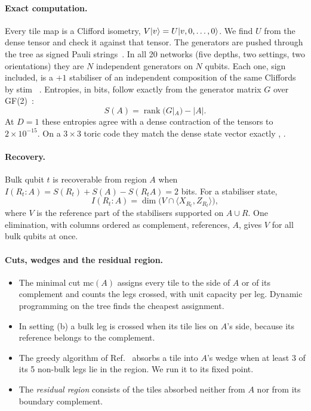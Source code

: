 \paragraph{Exact computation.} Every tile map is a Clifford isometry, $V\lvert v\rangle=U\lvert v,0,\dots,0\rangle$. We find $U$ from the dense tensor
and check it against that tensor. The generators are pushed through the tree as signed Pauli strings~\cite{aaronson2004}. In all 20
networks (five depths, two settings, two orientations) they are $N$ independent generators on $N$ qubits. Each one, sign included, is a
$+1$ stabiliser of an independent composition of the same Cliffords by stim~\cite{gidney2021} . Entropies, in bits,
follow exactly from the generator matrix $G$ over GF(2)~\cite{fattal2004,hamma2005}:
\begin{equation}\label{eq:holocode-rank}
S(A)=\operatorname{rank}\bigl(G|_A\bigr)-|A| .
\end{equation}
At $D=1$ these entropies agree with a dense contraction of the tensors to $2\times10^{-15}$. On a $3\times3$ toric code they match the
dense state vector exactly , .

\paragraph{Recovery.} Bulk qubit $t$ is recoverable from region $A$ when $I(R_t\!:\!A)=S(R_t)+S(A)-S(R_tA)=2$ bits. For a stabiliser
state,
\[
I(R_t\!:\!A)=\dim\bigl(V\cap\langle X_{R_t},Z_{R_t}\rangle\bigr),
\]
where $V$ is the reference part of the stabilisers supported on $A\cup R$. One elimination, with columns ordered as complement,
references, $A$, gives $V$ for all bulk qubits at once.

\paragraph{Cuts, wedges and the residual region.}
\begin{itemize}[nosep]
\item The minimal cut $\mathrm{mc}(A)$ assigns every tile to the side of $A$ or of its complement and counts the legs crossed, with unit
  capacity per leg. Dynamic programming on the tree finds the cheapest assignment.
\item In setting (b) a bulk leg is crossed when its tile lies on $A$'s side, because its reference belongs to the complement.
\item The greedy algorithm of Ref.~\cite{happy} absorbs a tile into $A$'s wedge when at least 3 of its 5 non-bulk legs lie in the
  region. We run it to its fixed point.
\item The \emph{residual region} consists of the tiles absorbed neither from $A$ nor from its boundary complement.
\end{itemize}

